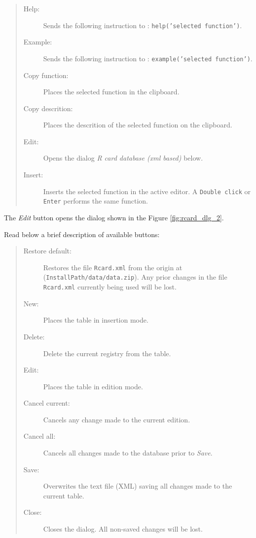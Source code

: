 \begin{quote}
  \begin{footnotesize}
    \begin{description}
      \item[Help:]
        Sends the following instruction to \RR{}: \texttt{help('selected function')}.
      \item[Example:]
        Sends the following instruction to \RR{}: \texttt{example('selected function')}.
      \item[Copy function:]
        Places the selected function in the clipboard.
      \item[Copy descrition:]
        Places the descrition of the selected function on the clipboard.
      \item[Edit:]
        Opens the dialog \textit{R card database (xml based)} below.
      \item[Insert:]
        Inserts the selected function in the active editor. A
        \texttt{Double click} or \texttt{Enter} performs the same function.
    \end{description}
  \end{footnotesize}
\end{quote}

The \textit{Edit} button opens the dialog shown in the Figure \ref{fig:rcard_dlg_2}.

Read below a brief description of available buttons:

\begin{quote}
  \begin{footnotesize}
    \begin{description}
      \item[Restore default:]
        Restores the file \texttt{Rcard.xml} from the origin at
        (\texttt{InstallPath/data/data.zip}). Any prior changes in the
        file \texttt{Rcard.xml} currently being used will be lost.
      \item[New:]
        Places the table in insertion mode.
      \item[Delete:]
        Delete the current registry from the table.
      \item[Edit:]
        Places the table in edition mode.
      \item[Cancel current:]
        Cancels any change made to the current edition.
      \item[Cancel all:]
        Cancels all changes made to the database prior to \textit{Save}.
      \item[Save:]
        Overwrites the text file (XML) saving all changes made to the current table.
      \item[Close:]
        Closes the dialog. All non-saved changes will be lost.
    \end{description}
  \end{footnotesize}
\end{quote}



